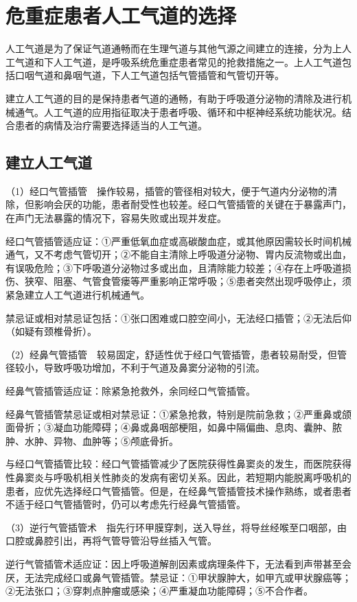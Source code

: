 \section{危重症患者人工气道的选择}

人工气道是为了保证气道通畅而在生理气道与其他气源之间建立的连接，分为上人工气道和下人工气道，是呼吸系统危重症患者常见的抢救措施之一。上人工气道包括口咽气道和鼻咽气道，下人工气道包括气管插管和气管切开等。

建立人工气道的目的是保持患者气道的通畅，有助于呼吸道分泌物的清除及进行机械通气。人工气道的应用指征取决于患者呼吸、循环和中枢神经系统功能状况。结合患者的病情及治疗需要选择适当的人工气道。

\subsection{建立人工气道}

（1）经口气管插管　操作较易，插管的管径相对较大，便于气道内分泌物的清除，但影响会厌的功能，患者耐受性也较差。经口气管插管的关键在于暴露声门，在声门无法暴露的情况下，容易失败或出现并发症。

经口气管插管适应证：①严重低氧血症或高碳酸血症，或其他原因需较长时间机械通气，又不考虑气管切开；②不能自主清除上呼吸道分泌物、胃内反流物或出血，有误吸危险；③下呼吸道分泌物过多或出血，且清除能力较差；④存在上呼吸道损伤、狭窄、阻塞、气管食管瘘等严重影响正常呼吸；⑤患者突然出现呼吸停止，须紧急建立人工气道进行机械通气。

禁忌证或相对禁忌证包括：①张口困难或口腔空间小，无法经口插管；②无法后仰（如疑有颈椎骨折）。

（2）经鼻气管插管　较易固定，舒适性优于经口气管插管，患者较易耐受，但管径较小，导致呼吸功增加，不利于气道及鼻窦分泌物的引流。

经鼻气管插管适应证：除紧急抢救外，余同经口气管插管。

经鼻气管插管禁忌证或相对禁忌证：①紧急抢救，特别是院前急救；②严重鼻或颌面骨折；③凝血功能障碍；④鼻或鼻咽部梗阻，如鼻中隔偏曲、息肉、囊肿、脓肿、水肿、异物、血肿等；⑤颅底骨折。

与经口气管插管比较：经口气管插管减少了医院获得性鼻窦炎的发生，而医院获得性鼻窦炎与呼吸机相关性肺炎的发病有密切关系。因此，若短期内能脱离呼吸机的患者，应优先选择经口气管插管。但是，在经鼻气管插管技术操作熟练，或者患者不适于经口气管插管时，仍可以考虑先行经鼻气管插管。

（3）逆行气管插管术　指先行环甲膜穿刺，送入导丝，将导丝经喉至口咽部，由口腔或鼻腔引出，再将气管导管沿导丝插入气管。

逆行气管插管术适应证：因上呼吸道解剖因素或病理条件下，无法看到声带甚至会厌，无法完成经口或鼻气管插管。禁忌证：①甲状腺肿大，如甲亢或甲状腺癌等；②无法张口；③穿刺点肿瘤或感染；④严重凝血功能障碍；⑤不合作者。

